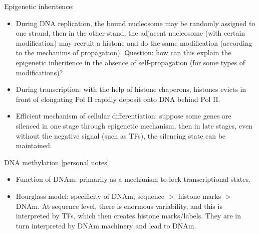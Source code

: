 \documentclass{report}
\begin{document}
Epigenetic inheritence: 
\begin{itemize}
	\item During DNA replication, the bound nucleosome may be randomly assigned to one strand, then in the other stand, the adjacent nucleosome (with certain modification) may recruit a histone and do the same modification (according to the mechanims of propagation). Question: how can this explain the epigenetic inheritence in the absence of self-propagation (for some types of modifications)? 
	\item During transcription: with the help of histone chaperons, histones evicts in front of elongating Pol II rapidly deposit onto DNA behind Pol II. 
	\item Efficient mechanism of cellular differentiation: suppose some genes are silenced in one stage through epigenetic mechanism, then in late stages, even without the negative signal (such as TFs), the silencing state can be maintained. 
\end{itemize}

DNA methylation [personal notes]
\begin{itemize}
	\item Function of DNAm: primarily as a mechanism to lock transcriptional states.
	
	\item Hourglass model: specificity of DNAm, sequence $>$ histone marks $>$ DNAm. At sequence level, there is enormous variability, and this is interpreted by TFs, which then creates histone marks/labels. They are in turn interpreted by DNAm machinery and lead to DNAm.
\end{itemize}
\end{document}
